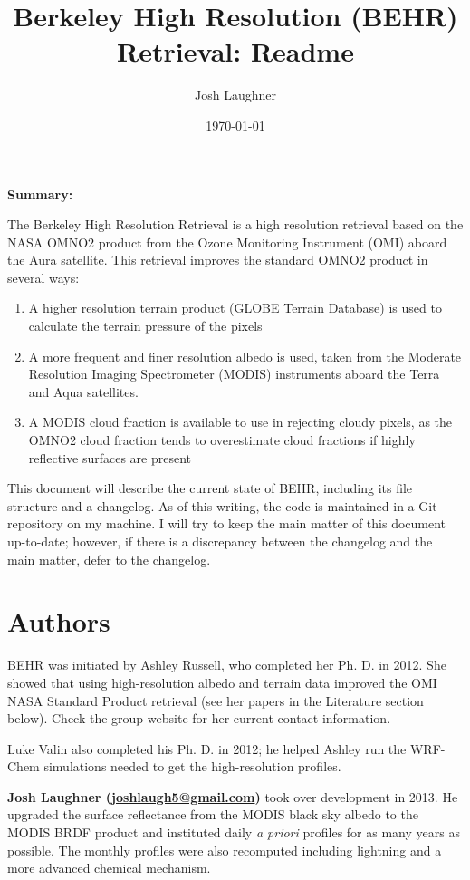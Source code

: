 \documentclass[12pt]{article}
\title{\textbf{Be}rkeley \textbf{H}igh \textbf{R}esolution (\textbf{BEHR}) Retrieval: Readme}
\author{Josh Laughner}
\date{\today}
\begin{document}
\maketitle
\setlength{\emergencystretch}{3em}

\noindent\textbf{Summary:}

	The Berkeley High Resolution Retrieval is a high resolution  retrieval based on the NASA OMNO2 product from the Ozone Monitoring Instrument (OMI) aboard the Aura satellite.  This  retrieval improves the standard OMNO2 product in several ways: 
	\begin{enumerate}
 	 \item A higher resolution terrain product (GLOBE Terrain Database) is used to calculate the terrain pressure of the pixels
	 \item A more frequent and finer resolution albedo is used, taken from the Moderate Resolution Imaging Spectrometer (MODIS) instruments aboard the Terra and Aqua satellites.
	 \item A MODIS cloud fraction is available to use in rejecting cloudy pixels, as the OMNO2 cloud fraction tends to overestimate cloud fractions if highly reflective surfaces are present
	\end{enumerate}
	
	This document will describe the current state of BEHR, including its file structure and a changelog.  As of this writing, the code is maintained in a Git repository on my machine.  I will try to keep the main matter of this document up-to-date; however, if there is a discrepancy between the changelog and the main matter, defer to the changelog.

{\hypersetup{linkcolor=black}
\tableofcontents
}

\section{Authors}\label{sec:authors}

	BEHR was initiated by Ashley Russell, who completed her Ph. D. in 2012.  She showed that using high-resolution albedo and terrain data improved the OMI NASA Standard Product retrieval (see her papers in the Literature section below).  Check the group website for her current contact information.
	
	Luke Valin also completed his Ph. D. in 2012; he helped Ashley run the WRF-Chem simulations needed to get the high-resolution  profiles.
	
	\textbf{Josh Laughner (\href{mailto:joshlaugh5@gmail.com}{joshlaugh5@gmail.com})} took over development in 2013.  He upgraded the surface reflectance from the MODIS black sky albedo to the MODIS BRDF product and instituted daily \emph{a priori} profiles for as many years as possible. The monthly profiles were also recomputed including lightning  and a more advanced chemical mechanism.
	
\end{document}
